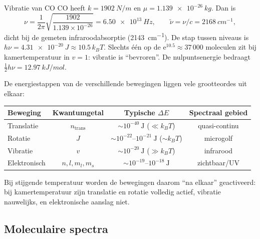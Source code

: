 \begin{voorbeeld}{Vibratie van CO}
CO heeft $k=\SI{1902}{N/m}$ en $\mu = \SI{1.139e-26}{kg}$. Dan is
\[
\nu = \frac{1}{2\pi}\sqrt{\frac{1902}{1.139\times10^{-26}}} = \SI{6.50e13}{Hz}, \qquad \tilde\nu = \nu/c = \SI{2168}{cm^{-1}},
\]
dicht bij de gemeten infraroodabsorptie (\SI{2143}{cm^{-1}}). De stap tussen niveaus is $h\nu = \SI{4.31e-20}{J} \approx 10.5\,k_BT$. Slechts één op de $\mathrm{e}^{10.5} \approx 37\,000$ moleculen zit bij kamertemperatuur in $v=1$: vibratie is ``bevroren''. De nulpuntsenergie bedraagt $\tfrac{1}{2}h\nu = \SI{12.97}{kJ/mol}$.
\end{voorbeeld}

De energiestappen van de verschillende bewegingen liggen vele grootteordes uit elkaar:

\begin{center}
\begin{tabular}{lccc}
\toprule
Beweging & Kwantumgetal & Typische $\Delta E$ & Spectraal gebied \\
\midrule
Translatie & $n_{\mathrm{trans}}$ & $\sim 10^{-40}~\mathrm{J}$ ($\ll k_BT$) & quasi-continu \\
Rotatie & $J$ & $\sim 10^{-22}$--$10^{-21}~\mathrm{J}$ ($\sim k_BT$) & microgolf \\
Vibratie & $v$ & $\sim 10^{-20}~\mathrm{J}$ ($\gg k_BT$) & infrarood \\
Elektronisch & $n,l,m_l,m_s$ & $\sim 10^{-19}$--$10^{-18}~\mathrm{J}$ & zichtbaar/UV \\
\bottomrule
\end{tabular}
\end{center}

Bij stijgende temperatuur worden de bewegingen daarom ``na elkaar'' geactiveerd: bij kamertemperatuur zijn translatie en rotatie volledig actief, vibratie nauwelijks, en elektronische aanslag niet.

\subsection{Moleculaire spectra}
\label{sec:moleculaire-spectra}

